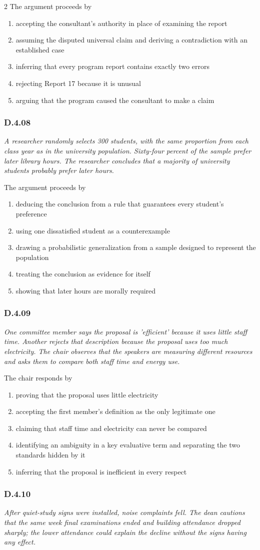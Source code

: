 \documentclass[10pt]{extarticle}
\newcommand{\choice}[1]{\item #1}
\newcommand{\bankitem}[1]{\subsubsection*{#1}}
\begin{document}
\begin{multicols}{2}
The argument proceeds by
\begin{enumerate}[label=(\alph*)]
  \choice{accepting the consultant's authority in place of examining the report}
  \choice{assuming the disputed universal claim and deriving a contradiction with an established case}
  \choice{inferring that every program report contains exactly two errors}
  \choice{rejecting Report 17 because it is unusual}
  \choice{arguing that the program caused the consultant to make a claim}
\end{enumerate}
\bankitem{D.4.08}
\emph{A researcher randomly selects 300 students, with the same proportion from each class year as in the university population. Sixty-four percent of the sample prefer later library hours. The researcher concludes that a majority of university students probably prefer later hours.}

The argument proceeds by
\begin{enumerate}[label=(\alph*)]
  \choice{deducing the conclusion from a rule that guarantees every student's preference}
  \choice{using one dissatisfied student as a counterexample}
  \choice{drawing a probabilistic generalization from a sample designed to represent the population}
  \choice{treating the conclusion as evidence for itself}
  \choice{showing that later hours are morally required}
\end{enumerate}
\bankitem{D.4.09}
\emph{One committee member says the proposal is 'efficient' because it uses little staff time. Another rejects that description because the proposal uses too much electricity. The chair observes that the speakers are measuring different resources and asks them to compare both staff time and energy use.}

The chair responds by
\begin{enumerate}[label=(\alph*)]
  \choice{proving that the proposal uses little electricity}
  \choice{accepting the first member's definition as the only legitimate one}
  \choice{claiming that staff time and electricity can never be compared}
  \choice{identifying an ambiguity in a key evaluative term and separating the two standards hidden by it}
  \choice{inferring that the proposal is inefficient in every respect}
\end{enumerate}
\bankitem{D.4.10}
\emph{After quiet-study signs were installed, noise complaints fell. The dean cautions that the same week final examinations ended and building attendance dropped sharply; the lower attendance could explain the decline without the signs having any effect.}


\end{multicols}
\end{document}
